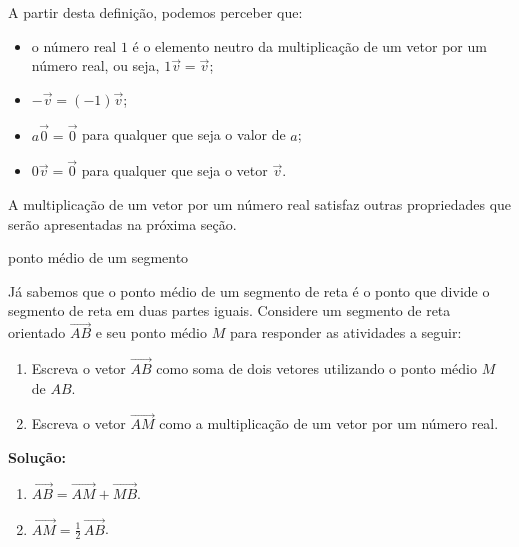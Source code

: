 A partir desta definição, podemos perceber que:
\begin{itemize}
\item {} 
o número real \(1\) é o elemento neutro da multiplicação de um vetor por um número real, ou seja, \(1\vec{v}=\vec{v}\);

\item {} 
\(-\vec{v}=(-1)\vec{v}\);

\item {} 
\(a\vec{0}=\vec{0}\) para qualquer que seja o valor de \(a\);

\item {} 
\(0\vec{v}=\vec{0}\) para qualquer que seja o vetor \(\vec{v}\).

\end{itemize}

A multiplicação de um vetor por um número real satisfaz outras propriedades que serão apresentadas na próxima seção.

\begin{example}{ ponto médio de um segmento}

Já sabemos que o ponto médio de um segmento de reta é o ponto que divide o segmento de reta em duas partes iguais. Considere um segmento de reta orientado \(\overrightarrow{AB}\) e seu ponto médio \(M\) para responder as atividades a seguir:
\begin{enumerate}
\item {} 
Escreva o vetor \(\overrightarrow{AB}\) como soma de dois vetores utilizando o ponto médio \(M\) de \(AB\).

\item {} 
Escreva o vetor \(\overrightarrow{AM}\) como a multiplicação de um vetor por um número real.

\end{enumerate}

\textbf{Solução:}
\begin{enumerate}
\item {} 
\(\overrightarrow{AB} = \overrightarrow{AM} + \overrightarrow{MB}\).
\begin{center}\end{center}
\item {} 
\(\overrightarrow{AM} = \frac{1}{2} \, \overrightarrow{AB}\).

\end{enumerate}
\end{example}

